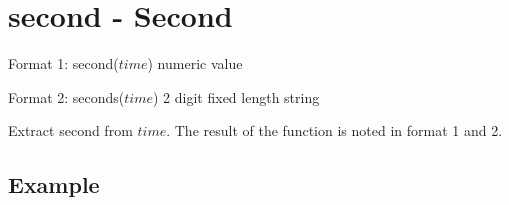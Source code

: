 
%

\section{second - Second\label{sect:second}}

Format 1: second($time$) numeric value

Format 2: seconds($time$) 2 digit fixed length string

Extract second from $time$.
The result of the function is noted in format 1 and 2.

\subsection*{Example}


%


